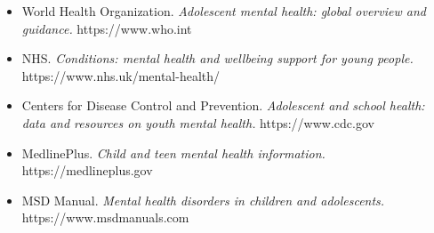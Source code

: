 \begin{itemize}
    \item World Health Organization. \textit{Adolescent mental health: global overview and guidance.} https://www.who.int
    \item NHS. \textit{Conditions: mental health and wellbeing support for young people.} https://www.nhs.uk/mental-health/
    \item Centers for Disease Control and Prevention. \textit{Adolescent and school health: data and resources on youth mental health.} https://www.cdc.gov
    \item MedlinePlus. \textit{Child and teen mental health information.} https://medlineplus.gov
    \item MSD Manual. \textit{Mental health disorders in children and adolescents.} https://www.msdmanuals.com
\end{itemize}
